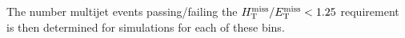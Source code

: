 The number multijet events passing/failing the $\mbox{$\mbox{$H_{\rm T}^{\rm miss}$} / \mbox{$E_\text{T}^{\rm miss}$}$} < 1.25$ requirement is then determined for simulations for each of these bins. 




